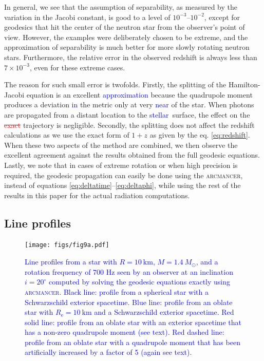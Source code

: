 \documentclass{aa}
\newcommand{\refe}[1]{\textcolor{blue}{{#1}}}
\newcommand{\refedel}[1]{\textcolor{red}{\sout{#1}}}
\newcommand{\Msun}{\ensuremath{M_{\odot}}}
\begin{document}
In general, we see that the assumption of separability, as measured by the variation in the Jacobi constant, is good to a level of $10^{-3}$--$10^{-2}$, except for geodesics that hit the center of the neutron star from the observer's point of view. 
However, the examples were deliberately chosen to be extreme, and the approximation of separability is much better for more slowly rotating neutron stars.
Furthermore, the relative error in the observed redshift is always less than $7 \times 10^{-3}$, even for these extreme cases.

The reason for such small error is twofolds.
Firstly, the splitting of the Hamilton-Jacobi equation is an excellent \refe{approximation} because the quadrupole moment produces a deviation \refe{in} the metric only at very \refe{near} of the star.
When photons are propagated from a distant location to the \refe{stellar} surface, the effect on the \refedel{exact} trajectory is negligible.
Secondly, the splitting does not affect the redshift calculations as we use the exact form of $1+z$ as given by the eq. \eqref{eq:redshift}.
When these two aspects of the method are combined, we then observe the excellent agreement against the results obtained from the full geodesic equations.
Lastly, we note that in cases of extreme rotation or when high precision is required, the geodesic propagation can easily be done using the \textsc{arcmancer}, instead of equations \eqref{eq:deltatime}--\eqref{eq:deltaphi}, while using the rest of the results in this paper for the actual radiation computations.


\subsection{Line profiles}

\begin{figure}
\texttt{[image: figs/fig9a.pdf]}
\caption{\label{fig:line_profiles}
    \refe{
Line profiles from a star with $R = 10~\mathrm{km}$, $M = 1.4~\Msun$, and a rotation frequency of $700$ Hz seen by an observer at an inclination $i = 20^{\circ}$ \refe{computed by solving the geodesic equations exactly using \textsc{arcmancer}}.
Black line: profile from a spherical star with a Schwarzschild exterior spacetime. 
Blue line: profile from an oblate star with $R_{\mathrm{e}} = 10~\mathrm{km}$ and a Schwarzschild exterior spacetime. 
Red solid line: profile from an oblate star with an exterior spacetime that has a non-zero quadrupole moment (see text). 
    Red dashed line: profile from an oblate star with a quadrupole moment that has been artificially increased by a factor of 5 (again see text).
    }
}
\end{figure}
\end{document}
